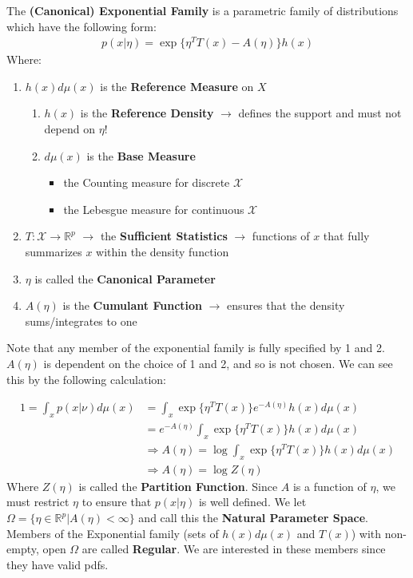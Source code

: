 \documentclass[]{article}
\theoremstyle{mattstyle}
\theoremstyle{definition}
\begin{document}
The \textbf{(Canonical) Exponential Family} is a parametric family of distributions which have the following form:
\begin{align}
p(x|\eta) = \exp\{ \eta^TT(x) - A(\eta)\}h(x)
\end{align}
Where:
\begin{enumerate}
	\item $h(x)d\mu(x)$ is the \textbf{Reference Measure} on $X$
	\begin{enumerate}
		\item $h(x)$ is the \textbf{Reference Density} $\rightarrow$ defines the support and must not depend on $\eta$!
		\item $d\mu(x)$ is the \textbf{Base Measure} 
		\begin{itemize}
			\item the Counting measure for discrete $\mathcal{X}$
			\item the Lebesgue measure for continuous $\mathcal{X}$
		\end{itemize}
	\end{enumerate}
	\item $T: \mathcal{X} \rightarrow \mathbb{R}^p$ $\rightarrow$ the \textbf{Sufficient Statistics} $\rightarrow$ functions of $x$ that fully summarizes $x$ within the density function
	\item $\eta$ is called the \textbf{Canonical Parameter}
	\item $A(\eta)$ is the \textbf{Cumulant Function} $\rightarrow$ ensures that the density sums/integrates to one
\end{enumerate}

Note that any member of the exponential family is fully specified by 1 and 2. $A(\eta)$ is dependent on the choice of 1 and 2, and so is not chosen. We can see this by the following calculation:

\begin{align*}
1 = \int_x p(x | \nu) d\mu(x) &= \int_x \exp\{ \eta^TT(x)\}e^{-A(\eta)} h(x)d\mu(x)\\
&= e^{-A(\eta)}\int_x \exp\{ \eta^TT(x)\}h(x)d\mu(x)\\
&\Rightarrow A(\eta) = \log \int_x \exp\{ \eta^TT(x)\}h(x)d\mu(x)\\
&\Rightarrow A(\eta) = \log Z(\eta)
\end{align*}
Where $Z(\eta)$ is called the \textbf{Partition Function}. Since $A$ is a function of $\eta$, we must restrict $\eta$ to ensure that $p(x|\eta)$ is well defined. We let $\Omega = \{ \eta \in \mathbb{R}^p | A(\eta) < \infty\}$ and call this the \textbf{Natural Parameter Space}. Members of the Exponential family (sets of $h(x)d\mu(x)$ and $T(x)$) with non-empty, open $\Omega$ are called \textbf{Regular}. We are interested in these members since they have valid pdfs.
\newpage
\end{document}
